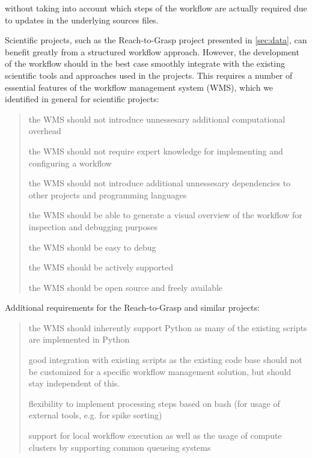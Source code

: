 without taking into account which steps of the workflow are actually required due to updates in the underlying sources files.

Scientific projects, such as the Reach-to-Grasp project presented in \cref{sec:data}, can benefit greatly from a structured workflow approach. However, the development of the workflow should in the best case smoothly integrate with the existing scientific tools and approaches used in the projects. This requires a number of essential features of the workflow management system (WMS), which we identified in general for scientific projects:
\begin{quote}
\begin{description}
 \setlength{\itemsep}{5pt}
 \setlength{\parskip}{0pt}
 \setlength{\parsep}{0pt}
 \item[slim] the WMS should not introduce unnessesary additional computational overhead
 \item[easy] the WMS should not require expert knowledge for implementing and configuring a workflow
 \item[standalone] the WMS should not introduce additional unnessesary dependencies to other projects and programming languages
  \item[visual] the WMS should be able to generate a visual overview of the workflow for inspection and debugging purposes
  \item[debuggable] the WMS should be easy to debug
  \item[active] the WMS should be actively supported
  \item[open] the WMS should be open source and freely available\\
\end{description}
\end{quote}
Additional requirements for the Reach-to-Grasp and similar projects:
\begin{quote}
\begin{description}
 \setlength{\itemsep}{5pt}
 \setlength{\parskip}{0pt}
 \setlength{\parsep}{0pt}
 \item[Python] the WMS should inherently support Python as many of the existing scripts are implemented in Python
 \item[integration] good integration with existing scripts as the existing code base should not be customized for a specific workflow management solution, but should stay independent of this.
 \item[flexible] flexibility to implement processing steps based on bash (for usage of external tools, e.g. for spike sorting)
 \item[hpc] support for local workflow execution as well as the usage of compute clusters by supporting common queueing systems
\end{description}
\end{quote}


